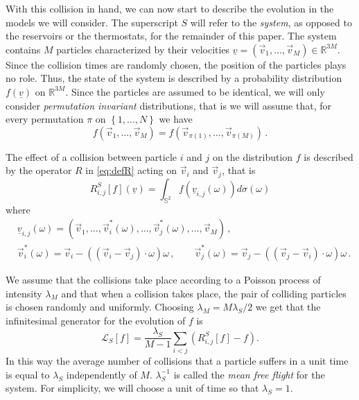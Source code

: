 \documentclass{article}
\newcommand\set[1]{\left\{ #1 \right\}}
\newcommand\vv{{\vec v}}
\begin{document}
With this collision in hand, we can now start to describe the evolution in the models we will consider. The superscript $S$ will refer to the
{\it system}, as opposed to the reservoirs or the thermostats, for the remainder of this paper. The system contains $M$
particles characterized by their velocities $\underline v=(\vec v_1,\ldots,\vec v_M)\in\mathds R^{3M}$. Since the
collision times are randomly chosen, the position of the particles plays no role. Thus, the state of the system is
described by a probability distribution $f(\underline v)$ on $\mathds R^{3M}$. Since the particles are assumed to be
identical, we will only consider {\it permutation invariant} distributions, that is we will assume that, for every 
permutation $\pi$
on $\set{1,\ldots,N}$ we have
\begin{equation}\label{eq:permu}
f(\vv_1,\ldots,\vv_M)=f(\vv_{\pi(1)},\ldots,\vv_{\pi(M)})\, .
\end{equation}

The effect of a collision between particle $i$ and $j$ on the distribution $f$ is described by the operator $R$ in
\eqref{eq:defR} acting on $\vec v_i$ and $\vec v_j$, that is
\begin{equation}\label{eq:RS}
 R_{i,j}^S[f](\underline v)=\int_{\mathds S^2}f(\underline v_{i,j}(\omega))d\sigma(\omega)
\end{equation}
where 
\begin{equation}\label{eq:romega}
\begin{aligned}
 &\underline v_{i,j}(\omega)=(\vec v_1,\ldots,\vec v_i^*(\omega),\ldots,\vec
v_j^*(\omega),\ldots,\vec v_M)\,,\\
 &\vec v_i^*(\omega)=\vec v_i-((\vec v_i-\vec v_j)\cdot\omega)\omega\,,\qquad \vec v_j^*(\omega)=\vec
v_j-((\vec v_j-\vec v_i)\cdot\omega)\omega\,.
\end{aligned}
\end{equation}

We assume that the collisions take place according to a Poisson process of intensity $\lambda_M$ and that when a
collision takes place, the pair of colliding particles is chosen randomly and uniformly. Choosing
$\lambda_M=M\lambda_S/2$ we get that the infinitesimal generator for the evolution of $f$ is
\begin{equation}\label{eq:genLS}
 \mathcal L_S[f]=\frac{\lambda_S}{M-1}\sum_{i<j} (R^S_{i,j}[f]-f).
\end{equation}
In this way the average number of collisions that a particle suffers in a unit time is equal to $\lambda_S$ independently 
of $M$. $\lambda_S^{-1}$ is called the {\it mean free flight} for the system. For simplicity, we will choose a unit of 
time so that $\lambda_S=1$.
\end{document}
